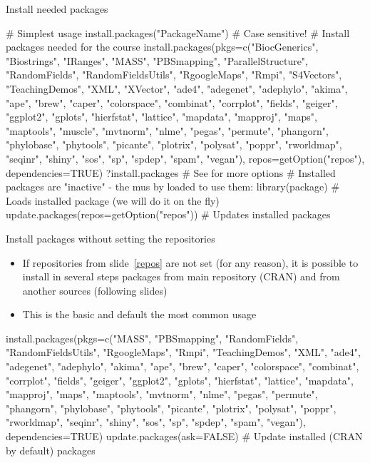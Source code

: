 \documentclass[compress, ucs, xelatex, 11pt, xcolor=svgnames,
  hyperref={
    bookmarks=true,
    unicode=true,
    colorlinks=true,
    pdftitle={Molecular data in R},
    plainpages=false,
    pdfauthor={Vojtech Zeisek},
    pdfsubject={Course about phylogeny and evolution in R},
    pdfcreator={XeLaTeX},
    pdfkeywords={R, evolution, phylogeny, molecular data},
    linkcolor=Tomato,
    anchorcolor=SaddleBrown,
    citecolor=Goldenrod,
    filecolor=DarkMagenta,
    menucolor=Sienna,
    urlcolor=DarkTurquoise,
    pdftex},
  url={hyphens, lowtilde} %
  ]{beamer}
\begin{document}
\begin{frame}[fragile]{Install needed packages} %
  \begin{spluscode}
    # Simplest usage
    install.packages("PackageName") # Case sensitive!
    # Install packages needed for the course
    install.packages(pkgs=c("BiocGenerics", "Biostrings",
      "IRanges", "MASS", "PBSmapping", "ParallelStructure", "RandomFields",
      "RandomFieldsUtils", "RgoogleMaps", "Rmpi", "S4Vectors",
      "TeachingDemos", "XML", "XVector", "ade4", "adegenet", "adephylo",
      "akima", "ape", "brew", "caper", "colorspace", "combinat", "corrplot",
      "fields", "geiger", "ggplot2", "gplots", "hierfstat",
      "lattice", "mapdata", "mapproj", "maps", "maptools", "muscle",
      "mvtnorm", "nlme", "pegas", "permute", "phangorn", "phylobase",
      "phytools", "picante", "plotrix", "polysat", "poppr", "rworldmap",
      "seqinr", "shiny", "sos", "sp", "spdep", "spam", "vegan"),
      repos=getOption("repos"), dependencies=TRUE)
    ?install.packages # See for more options
    # Installed packages are "inactive" - the mus by loaded to use them:
    library(package) # Loads installed package (we will do it on the fly)
    update.packages(repos=getOption("repos")) # Updates installed packages
  \end{spluscode}
\end{frame}

\begin{frame}[fragile]{Install packages without setting the repositories} %
  \begin{itemize}
   \item If repositories from slide~\ref{repos} are not set (for any reason), it is possible to install in several steps packages from main repository (CRAN) and from another sources (following slides)
   \item This is the basic and default the most common usage
  \end{itemize}
  \begin{spluscode}
    install.packages(pkgs=c("MASS", "PBSmapping",
      "RandomFields", "RandomFieldsUtils", "RgoogleMaps", "Rmpi",
      "TeachingDemos", "XML", "ade4", "adegenet", "adephylo", "akima",
      "ape", "brew", "caper", "colorspace", "combinat", "corrplot",
      "fields", "geiger", "ggplot2", "gplots", "hierfstat",
      "lattice", "mapdata", "mapproj", "maps", "maptools", "mvtnorm",
      "nlme", "pegas", "permute", "phangorn", "phylobase", "phytools",
      "picante", "plotrix", "polysat", "poppr", "rworldmap", "seqinr",
      "shiny", "sos", "sp", "spdep", "spam", "vegan"), dependencies=TRUE)
    update.packages(ask=FALSE) # Update installed (CRAN by default) packages
  \end{spluscode}
\end{frame}
\end{document}
